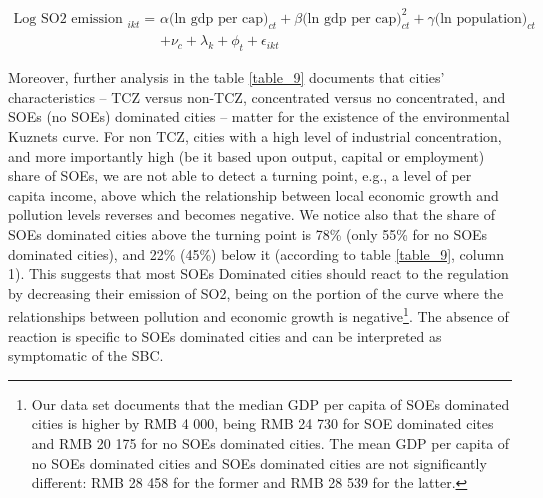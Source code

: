 \documentclass[12pt]{article}
\begin{document}
\begin{equation} \label{eq:equation_4}
\begin{aligned}
\text {Log SO2 emission }_{i k t} = & \alpha \text{(ln gdp per cap)}_{ct}  + \beta\text{(ln gdp per cap)}^2_{ct}  + \gamma \text{(ln population)}_{ct} \\ 
& + \nu_{c}+\lambda_{k}+\phi_{t}+\epsilon_{i k t}
\end{aligned}
\end{equation}

Moreover, further analysis in the table \ref{table_9} documents that cities' characteristics – TCZ versus non-TCZ, concentrated versus no concentrated, and SOEs (no SOEs) dominated cities – matter for the existence of the environmental Kuznets curve. For non TCZ, cities with a high level of industrial concentration, and more importantly high (be it based upon output, capital or employment) share of SOEs, we are not able to detect a turning point, e.g., a level of per capita income, above which the relationship between local economic growth and pollution levels reverses and becomes negative. We notice also that the share of SOEs dominated cities above the turning point is 78\% (only 55\% for no SOEs dominated cities), and 22\% (45\%) below it (according to table \ref{table_9}, column 1). This suggests that most SOEs Dominated cities should react to the regulation by decreasing their emission of SO2, being on the portion of the curve where the relationships between pollution and economic growth is negative\footnote{Our data set documents that the median GDP per capita of SOEs dominated cities is higher by RMB 4 000, being RMB 24 730 for SOE dominated cites and RMB 20 175 for no SOEs dominated cities. The mean GDP per capita of no SOEs dominated cities and SOEs dominated cities are not significantly different: RMB 28 458 for the former and RMB 28 539 for the latter.}. The absence of reaction is specific to SOEs dominated cities and can be interpreted as symptomatic of the SBC.
\end{document}
